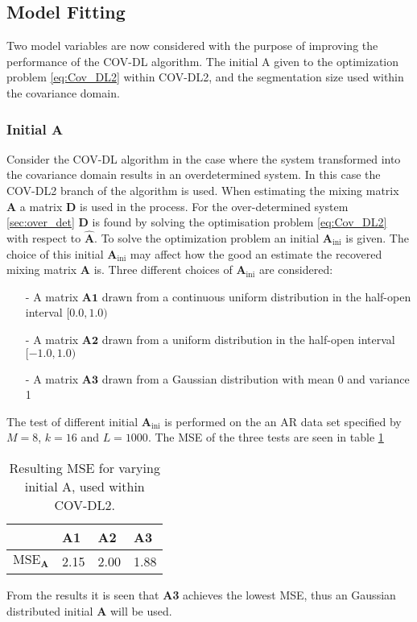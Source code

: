 \subsection{Model Fitting}
Two model variables are now considered with the purpose of improving the performance of the COV-DL algorithm. The initial A given to the optimization problem \eqref{eq:Cov_DL2} within COV-DL2, and the segmentation size used within the covariance domain.   
\subsubsection*{Initial $\textbf{A}$}
Consider the COV-DL algorithm in the case where the system transformed into the covariance domain results in an overdetermined system. In this case the COV-DL2 branch of the algorithm is used. 
When estimating the mixing matrix $\mathbf{A}$ a matrix $\mathbf{D}$ is used in the process. For the over-determined system \ref{sec:over_det} $\mathbf{D}$ is found by solving the optimisation problem \eqref{eq:Cov_DL2} with respect to $\hat{\textbf{A}}$. To solve the optimization problem an initial $\mathbf{A}_{\text{ini}}$ is given. The choice of this initial $\mathbf{A}_{\text{ini}}$ may affect how the good an estimate the recovered mixing matrix $\mathbf{A}$ is.
Three different choices of $\mathbf{A}_{\text{ini}}$ are considered:
\begin{itemize}
\item[-] A matrix $\mathbf{A1}$ drawn from a continuous uniform distribution in the half-open interval $[0.0, 1.0)$
\item[-] A matrix $\mathbf{A2}$ drawn from a uniform distribution in the half-open interval $[-1.0, 1.0)$
\item[-] A matrix $\mathbf{A3}$ drawn from a Gaussian distribution with mean 0 and variance 1
\end{itemize}
The test of different initial $\mathbf{A}_{\text{ini}}$ is performed on the 
an AR data set specified by  $M = 8$, $k = 16$ and $L = 1000$. 
The MSE of the three tests are seen in table \ref{tab:iniA} 
\begin{table}[]
\centering
\begin{tabular}{|l|l|l|l|} 
\hline
                          & \textbf{A1} & \textbf{A2} & \textbf{A3} \\
\hline $\text{MSE}_{\mathbf{A}}$ &   2.15          & 2.00            & 1.88\\
\hline           
\end{tabular}
\caption{Resulting MSE for varying initial A, used within COV-DL2.}
\label{tab:iniA}
\end{table}
From the results it is seen that \textbf{A3} achieves the lowest MSE, thus an Gaussian distributed initial $\textbf{A}$ will be used.    

